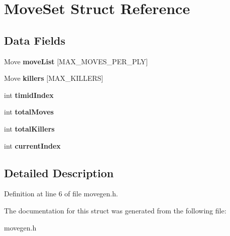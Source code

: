 \hypertarget{struct_move_set}{\section{Move\-Set Struct Reference}
\label{struct_move_set}
}
\subsection*{Data Fields}
\begin{DoxyCompactItemize}
\item 
\hypertarget{struct_move_set_af666f01f095ce5c436fef6f9e07ade17}{Move {\bfseries move\-List} \mbox{[}M\-A\-X\-\_\-\-M\-O\-V\-E\-S\-\_\-\-P\-E\-R\-\_\-\-P\-L\-Y\mbox{]}}\label{struct_move_set_af666f01f095ce5c436fef6f9e07ade17}

\item 
\hypertarget{struct_move_set_aeda194b883da9517f637181c0a46bc28}{Move {\bfseries killers} \mbox{[}M\-A\-X\-\_\-\-K\-I\-L\-L\-E\-R\-S\mbox{]}}\label{struct_move_set_aeda194b883da9517f637181c0a46bc28}

\item 
\hypertarget{struct_move_set_a1f1b96a41e1d97c4aadd18159e02d7fd}{int {\bfseries timid\-Index}}\label{struct_move_set_a1f1b96a41e1d97c4aadd18159e02d7fd}

\item 
\hypertarget{struct_move_set_a9184b1f3f1f75ae9a141707b121619a2}{int {\bfseries total\-Moves}}\label{struct_move_set_a9184b1f3f1f75ae9a141707b121619a2}

\item 
\hypertarget{struct_move_set_a0eb297e6e9fe8f0f07f321df80b973c9}{int {\bfseries total\-Killers}}\label{struct_move_set_a0eb297e6e9fe8f0f07f321df80b973c9}

\item 
\hypertarget{struct_move_set_af67fe7a40138ec20f2784bb278cc697b}{int {\bfseries current\-Index}}\label{struct_move_set_af67fe7a40138ec20f2784bb278cc697b}

\end{DoxyCompactItemize}


\subsection{Detailed Description}


Definition at line 6 of file movegen.\-h.



The documentation for this struct was generated from the following file\-:\begin{DoxyCompactItemize}
\item 
movegen.\-h\end{DoxyCompactItemize}
